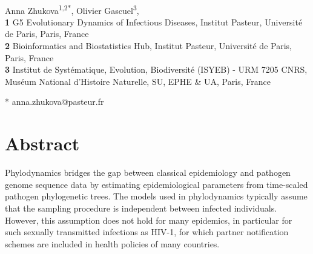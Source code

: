 \documentclass[10pt,letterpaper]{article}
\begin{document}
\vspace*{0.2in}

\begin{flushleft}
{\Large
\textbf{} %
}
\newline
\\
Anna Zhukova\textsuperscript{1,2*},
Olivier Gascuel\textsuperscript{3},
\\
\bigskip
\textbf{1} G5 Evolutionary Dynamics of Infectious Diseases, Institut Pasteur, Université de Paris, Paris, France
\\
\textbf{2} Bioinformatics and Biostatistics Hub, Institut Pasteur, Université de Paris, Paris, France
\\
\textbf{3} Institut de Syst\'{e}matique, Evolution, Biodiversit\'{e} (ISYEB) - URM 7205 CNRS, Mus\'{e}um National d'Histoire Naturelle, SU, EPHE \& UA, Paris, France
\\
\bigskip



* anna.zhukova@pasteur.fr

\end{flushleft}
\section*{Abstract}
Phylodynamics bridges the gap between classical epidemiology and pathogen genome sequence data by estimating epidemiological parameters from time-scaled pathogen phylogenetic trees. The models used in phylodynamics typically assume that the sampling procedure is independent between infected individuals. However, this assumption does not hold for many epidemics, in particular for such sexually transmitted infections as HIV-1, for which partner notification schemes are included in health policies of many countries. 
\end{document}
